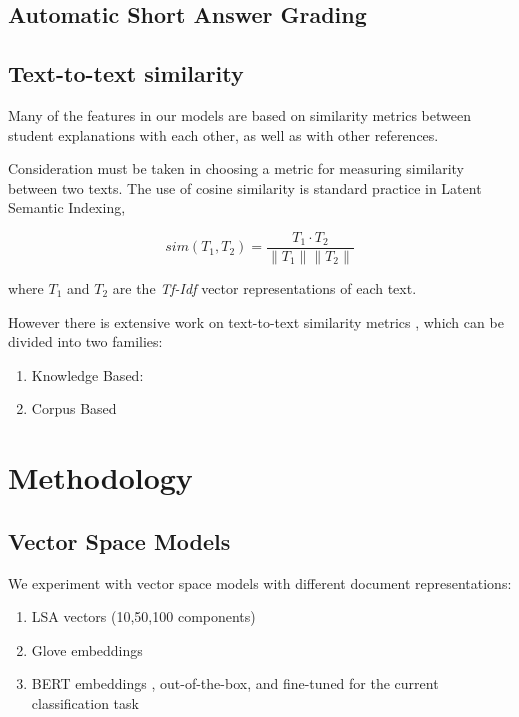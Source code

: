 \documentclass[sigconf]{acmart}
\begin{document}
\subsection{Automatic Short Answer Grading}


\subsection{Text-to-text similarity}
Many of the features in our models are based on 
similarity 
metrics between 
student explanations with each other, as well as 
with other 
references. 

Consideration must be taken in choosing a metric 
for measuring 
similarity 
between two texts. 
The use of cosine similarity is standard practice 
in Latent 
Semantic 
Indexing,

\begin{equation}
sim(T_1,T_2) = \frac{T_1 \cdot T_2}{\| T_1 \| \| 
T_2 \|}
\end{equation}

where $T_1$ and $T_2$ are the \textit{Tf-Idf} 
vector 
representations of 
each text.

However there is extensive work on text-to-text 
similarity 
metrics 
\cite{mihalcea_corpus-based_2006}, 
which can be divided into two families:
\begin{enumerate}
	\item Knowledge Based:
	\item Corpus Based
\end{enumerate}


\section{Methodology}

\subsection{Vector Space Models}
We experiment with vector space models with 
different document representations:
\begin{enumerate}
	\item LSA vectors (10,50,100 components) 
	\cite{deerwester_indexing_1990}
	\item Glove embeddings 
	\cite{pennington_glove:_2014}
	\item BERT embeddings \cite{devlin_bert_2018}, 
	out-of-the-box, and 
	fine-tuned for the current classification task
\end{enumerate}
\end{document}

